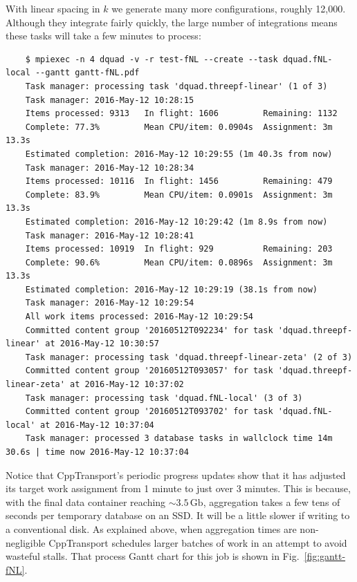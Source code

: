 \documentclass[11pt,a4paper]{article}
\newcommand{\packagefont}{\sffamily}
\newcommand{\CppTransport}{{\packagefont CppTransport}}
\newcommand{\Gb}{\,\mathrm{Gb}}
\begin{document}
With linear spacing in $k$ we generate many more configurations,
roughly 12,000.
Although they integrate fairly quickly, the large number
of integrations means these tasks will take a few minutes to process:
\begin{verbatim}
    $ mpiexec -n 4 dquad -v -r test-fNL --create --task dquad.fNL-local --gantt gantt-fNL.pdf
    Task manager: processing task 'dquad.threepf-linear' (1 of 3)
    Task manager: 2016-May-12 10:28:15
    Items processed: 9313   In flight: 1606         Remaining: 1132         
    Complete: 77.3%         Mean CPU/item: 0.0904s  Assignment: 3m 13.3s    
    Estimated completion: 2016-May-12 10:29:55 (1m 40.3s from now)                  
    Task manager: 2016-May-12 10:28:34
    Items processed: 10116  In flight: 1456         Remaining: 479          
    Complete: 83.9%         Mean CPU/item: 0.0901s  Assignment: 3m 13.3s    
    Estimated completion: 2016-May-12 10:29:42 (1m 8.9s from now)                   
    Task manager: 2016-May-12 10:28:41
    Items processed: 10919  In flight: 929          Remaining: 203          
    Complete: 90.6%         Mean CPU/item: 0.0896s  Assignment: 3m 13.3s    
    Estimated completion: 2016-May-12 10:29:19 (38.1s from now)                     
    Task manager: 2016-May-12 10:29:54
    All work items processed: 2016-May-12 10:29:54                                  
    Committed content group '20160512T092234' for task 'dquad.threepf-linear' at 2016-May-12 10:30:57
    Task manager: processing task 'dquad.threepf-linear-zeta' (2 of 3)
    Committed content group '20160512T093057' for task 'dquad.threepf-linear-zeta' at 2016-May-12 10:37:02
    Task manager: processing task 'dquad.fNL-local' (3 of 3)
    Committed content group '20160512T093702' for task 'dquad.fNL-local' at 2016-May-12 10:37:04
    Task manager: processed 3 database tasks in wallclock time 14m 30.6s | time now 2016-May-12 10:37:04
\end{verbatim}
Notice that {\CppTransport}'s
periodic progress updates
show that it has adjusted its target work assignment from 1 minute
to just over 3 minutes.
This is because, with the final data container reaching $\sim 3.5 \Gb$, aggregation
takes a few tens of seconds per temporary database on an SSD.
It will be a little slower if writing to a conventional disk.
As explained above,
when aggregation times are non-negligible
{\CppTransport} schedules larger batches of work in an attempt
to avoid wasteful stalls.
That process Gantt chart for this job is shown
in Fig.~\ref{fig:gantt-fNL}.
\end{document}
